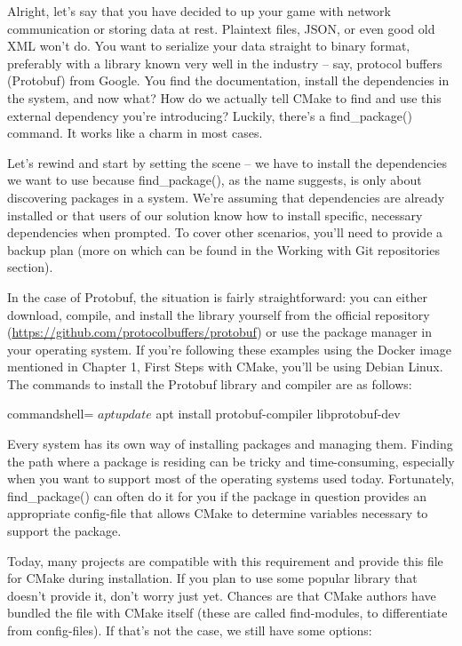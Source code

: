 Alright, let's say that you have decided to up your game with network communication or storing data at rest. Plaintext files, JSON, or even good old XML won't do. You want to serialize your data straight to binary format, preferably with a library known very well in the industry – say, protocol buffers (Protobuf) from Google. You find the documentation, install the dependencies in the system, and now what? How do we actually tell CMake to find and use this external dependency you're introducing? Luckily, there's a find\_package() command. It works like a charm in most cases.

Let's rewind and start by setting the scene – we have to install the dependencies we want to use because find\_package(), as the name suggests, is only about discovering packages in a system. We're assuming that dependencies are already installed or that users of our solution know how to install specific, necessary dependencies when prompted. To cover other scenarios, you'll need to provide a backup plan (more on which can be found in the Working with Git repositories section).

In the case of Protobuf, the situation is fairly straightforward: you can either download, compile, and install the library yourself from the official repository (\url{https://github.com/protocolbuffers/protobuf}) or use the package manager in your operating system. If you're following these examples using the Docker image mentioned in Chapter 1, First Steps with CMake, you'll be using Debian Linux. The commands to install the Protobuf library and compiler are as follows:

\begin{tcblisting}{commandshell={}}
$ apt update
$ apt install protobuf-compiler libprotobuf-dev
\end{tcblisting}

Every system has its own way of installing packages and managing them. Finding the path where a package is residing can be tricky and time-consuming, especially when you want to support most of the operating systems used today. Fortunately, find\_package() can often do it for you if the package in question provides an appropriate config-file that allows CMake to determine variables necessary to support the package.

Today, many projects are compatible with this requirement and provide this file for CMake during installation. If you plan to use some popular library that doesn't provide it, don't worry just yet. Chances are that CMake authors have bundled the file with CMake itself (these are called find-modules, to differentiate from config-files). If that's not the case, we still have some options:

